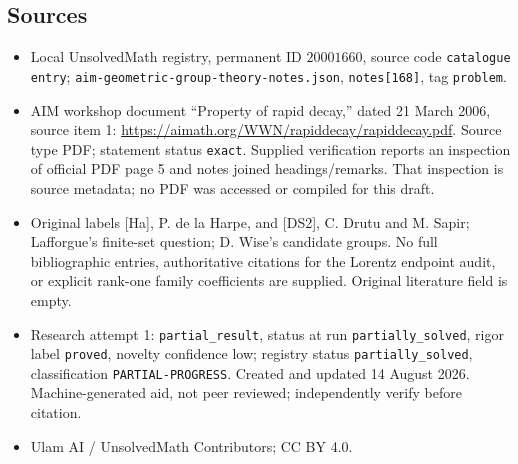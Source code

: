 \documentclass[11pt]{article}
\begin{document}
\subsection{Sources}
\begin{itemize}
\item Local UnsolvedMath registry, permanent ID \(20001660\), source code \texttt{catalogue entry}; \texttt{aim-geometric-group-theory-notes.json}, \texttt{notes[168]}, tag \texttt{problem}.
\item AIM workshop document ``Property of rapid decay,'' dated 21 March 2006, source item 1: \url{https://aimath.org/WWN/rapiddecay/rapiddecay.pdf}. Source type PDF; statement status \texttt{exact}. Supplied verification reports an inspection of official PDF page 5 and notes joined headings/remarks. That inspection is source metadata; no PDF was accessed or compiled for this draft.
\item Original labels [Ha], P. de la Harpe, and [DS2], C. Drutu and M. Sapir; Lafforgue's finite-set question; D. Wise's candidate groups. No full bibliographic entries, authoritative citations for the Lorentz endpoint audit, or explicit rank-one family coefficients are supplied. Original literature field is empty.
\item Research attempt 1: \texttt{partial\_result}, status at run \texttt{partially\_solved}, rigor label \texttt{proved}, novelty confidence low; registry status \texttt{partially\_solved}, classification \texttt{PARTIAL-PROGRESS}. Created and updated 14 August 2026. Machine-generated aid, not peer reviewed; independently verify before citation.
\item Ulam AI / UnsolvedMath Contributors; CC BY 4.0.
\end{itemize}
\end{document}
